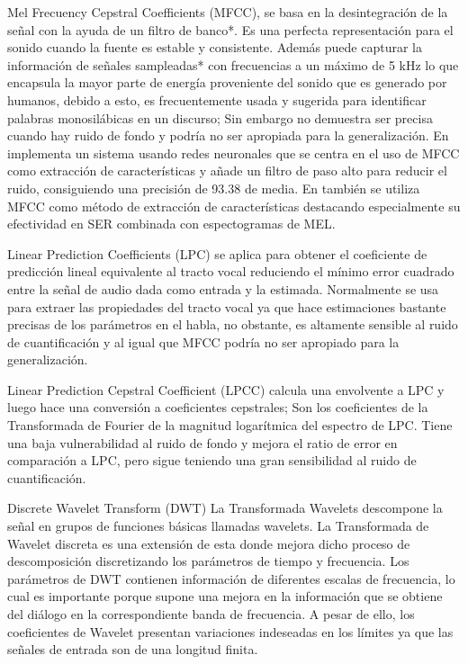 \documentclass[11pt,a4paper,spanish]{book}
\begin{document}
	Mel Frecuency Cepstral Coefficients (MFCC), se basa en la desintegración de la señal con la ayuda de un filtro de banco*. Es una perfecta representación para el sonido cuando la fuente es estable y consistente. Además puede capturar la información de señales sampleadas* con frecuencias a un máximo de 5 kHz lo que encapsula la mayor parte de energía proveniente del sonido que es generado por humanos, debido a esto, es frecuentemente usada y sugerida para identificar palabras monosilábicas en un discurso; Sin embargo no demuestra ser precisa cuando hay ruido de fondo y podría no ser apropiada para la generalización. En \cite{Sarkania2013} implementa un sistema usando redes neuronales que se centra en el uso de MFCC como extracción de características y añade un filtro  de paso alto para reducir el ruido, consiguiendo una precisión de 93.38 de media. En \cite{Wang2020} también se utiliza MFCC como método de extracción de características destacando especialmente su efectividad en SER combinada con espectogramas de MEL.
	
	Linear Prediction Coefficients (LPC) se aplica para obtener el coeficiente de predicción lineal equivalente al tracto vocal reduciendo el mínimo error cuadrado entre la señal de audio dada como entrada y la estimada. Normalmente se usa para extraer las propiedades del tracto vocal ya que hace estimaciones bastante precisas de los parámetros en el habla, no obstante, es altamente sensible al ruido de cuantificación y al igual que MFCC podría no ser apropiado para la generalización.
	
	Linear Prediction Cepstral Coefficient (LPCC) calcula una envolvente a LPC y luego hace una conversión a coeficientes cepstrales; Son los coeficientes de la Transformada de Fourier de la magnitud logarítmica del espectro de LPC. Tiene una baja vulnerabilidad al ruido de fondo y mejora el ratio de error en comparación a LPC, pero sigue teniendo una gran sensibilidad al ruido de cuantificación.
	
	Discrete Wavelet Transform (DWT) La Transformada Wavelets descompone la señal en grupos de funciones básicas llamadas wavelets. La Transformada de Wavelet discreta es una extensión de esta donde mejora dicho proceso de descomposición discretizando los parámetros de tiempo y frecuencia. Los parámetros de DWT contienen información de diferentes escalas de frecuencia, lo cual es importante porque supone una mejora en la información que se obtiene del diálogo en la correspondiente banda de frecuencia. A pesar de ello, los coeficientes de Wavelet presentan variaciones indeseadas en los límites ya que las señales de entrada son de una longitud finita.
	
\end{document}
